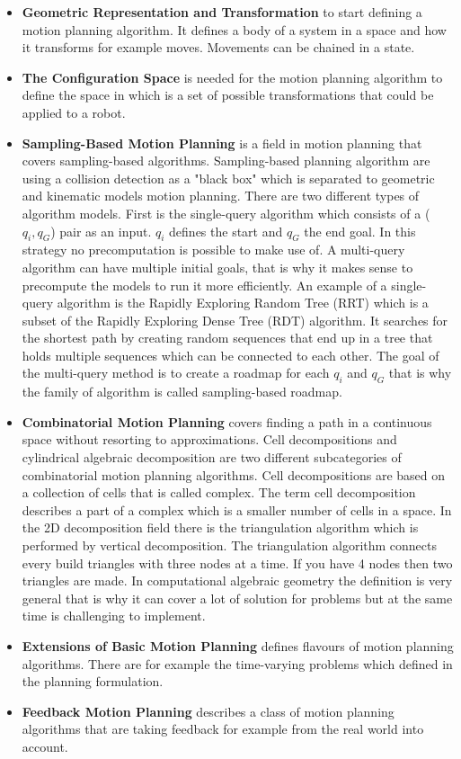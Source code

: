 \begin{itemize}
    \item \textbf{Geometric Representation and Transformation} to start defining a motion planning algorithm. It defines a body of a system in a space and how it transforms for example moves. Movements can be chained in a state.
    \item \textbf{The Configuration Space} is needed for the motion planning algorithm to define the space in which is a set of possible transformations that could be applied to a robot.
    \item \textbf{Sampling-Based Motion Planning} is a field in motion planning that covers sampling-based algorithms. Sampling-based planning algorithm are using a collision detection as a "black box" which is separated to geometric and kinematic models motion planning. There are two different types of algorithm models. First is the single-query algorithm which consists of a ($q_i,q_G$) pair as an input. $q_i$ defines the start and $q_G$ the end goal. In this strategy no precomputation is possible to make use of. A multi-query algorithm can have multiple initial goals, that is why it makes sense to precompute the models to run it more efficiently. An example of a single-query algorithm is the Rapidly Exploring Random Tree (RRT) which is a subset of the Rapidly Exploring Dense Tree (RDT) algorithm. It searches for the shortest path by creating random sequences that end up in a tree that holds multiple sequences which can be connected to each other. The goal of the multi-query  method is to create a roadmap for each $q_i$ and $q_G$ that is why the family of algorithm is called sampling-based roadmap.
    \item \textbf{Combinatorial Motion Planning} covers finding a path in a continuous space without resorting to approximations. Cell decompositions and cylindrical algebraic decomposition are two different subcategories of combinatorial motion planning algorithms. Cell decompositions are based on a collection of cells that is called complex. The term cell decomposition describes a part of a complex which is a smaller number of cells in a space. In the 2D decomposition field there is the triangulation algorithm which is performed by vertical decomposition. The triangulation algorithm connects every build triangles with three nodes at a time. If you have 4 nodes then two triangles are made. In computational algebraic geometry the definition is very general that is why it can cover a lot of solution for problems but at the same time is challenging to implement.
    \item \textbf{Extensions of Basic Motion Planning} defines flavours of motion planning algorithms. There are for example the time-varying problems which defined in the planning formulation.
    \item \textbf{Feedback Motion Planning} describes a class of motion planning algorithms that are taking feedback for example from the real world into account.
\end{itemize}

